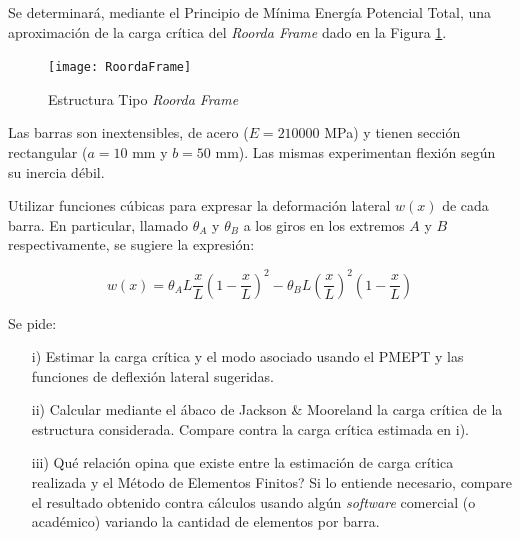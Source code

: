 \bigskip
\begin{exercise}
	
	Se determinará, mediante el Principio de Mínima Energía Potencial Total, una aproximación de la carga crítica del \textit{Roorda Frame} dado en la Figura \ref{fig:Ej6b}.
	
	\begin{figure}[h!]
		\centering
		\texttt{[image: RoordaFrame]}
		\caption{Estructura Tipo \textit{Roorda Frame}}
		\label{fig:Ej6b}
	\end{figure}
	
	Las barras son inextensibles, de acero ($E=210000$ MPa) y tienen sección rectangular ($a=10 \text{ mm}$ y $b=50\text{ mm}$). Las mismas experimentan flexión según su inercia débil.
	
	Utilizar funciones cúbicas para expresar la deformación lateral $w(x)$ de cada barra. En particular, llamado $\theta_A$ y $\theta_B$ a los giros en los extremos $A$ y $B$ respectivamente, se sugiere la expresión:
	
	$$w(x) = \theta_A L \frac{x}{L}\left(1-\frac{x}{L}\right)^2 - \theta_B L \left(\frac{x}{L}\right)^2 \left( 1-\frac{x}{L} \right)$$
	
	Se pide:
	
	\begin{enumerate}
		\item[i)] Estimar la carga crítica y el modo asociado usando el PMEPT y las funciones de deflexión lateral sugeridas.
		
		\item[ii)] Calcular mediante el ábaco de Jackson \& Mooreland la carga crítica de la estructura considerada. Compare contra la carga crítica estimada en i).
		
		\item[iii)] \textquestiondown Qué relación opina que existe entre la estimación de carga crítica realizada y el Método de Elementos Finitos? Si lo entiende necesario, compare el resultado obtenido contra cálculos usando algún \textit{software} comercial (o académico) variando la cantidad de elementos por barra.
	\end{enumerate}
	
	
\end{exercise}



